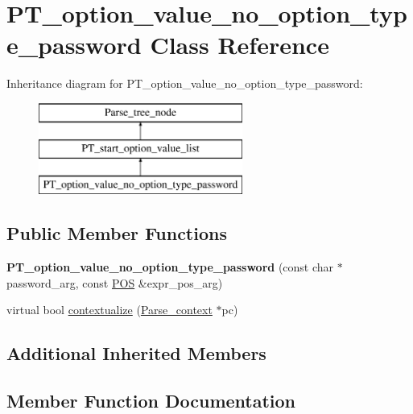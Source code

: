 \hypertarget{classPT__option__value__no__option__type__password}{}\section{P\+T\+\_\+option\+\_\+value\+\_\+no\+\_\+option\+\_\+type\+\_\+password Class Reference}
\label{classPT__option__value__no__option__type__password}
Inheritance diagram for P\+T\+\_\+option\+\_\+value\+\_\+no\+\_\+option\+\_\+type\+\_\+password\+:\begin{figure}[H]
\begin{center}
\leavevmode
\includegraphics[height=3.000000cm]{classPT__option__value__no__option__type__password}
\end{center}
\end{figure}
\subsection*{Public Member Functions}
\begin{DoxyCompactItemize}
\item 
\mbox{\label{classPT__option__value__no__option__type__password_a1c8980a0bc3543688fb7d96878fb9231}} 
{\bfseries P\+T\+\_\+option\+\_\+value\+\_\+no\+\_\+option\+\_\+type\+\_\+password} (const char $\ast$password\+\_\+arg, const \mbox{\hyperlink{structYYLTYPE}{P\+OS}} \&expr\+\_\+pos\+\_\+arg)
\item 
virtual bool \mbox{\hyperlink{classPT__option__value__no__option__type__password_a3c352bcf85ffefcfa3cd524691061a9d}{contextualize}} (\mbox{\hyperlink{structParse__context}{Parse\+\_\+context}} $\ast$pc)
\end{DoxyCompactItemize}
\subsection*{Additional Inherited Members}


\subsection{Member Function Documentation}
\mbox{\label{classPT__option__value__no__option__type__password_a3c352bcf85ffefcfa3cd524691061a9d}} 
